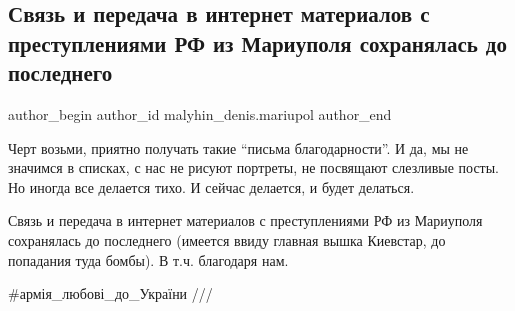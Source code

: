  
 
 
 
 

\subsection{Связь и передача в интернет материалов с преступлениями РФ из Мариуполя сохранялась до последнего}
\label{sec:19_01_2023.fb.malyhin_denis.mariupol.1.svyaz_i_peredacha_v_}

\ifcmt
 author_begin
   author_id malyhin_denis.mariupol
 author_end
\fi

Черт возьми, приятно получать такие \enquote{письма благодарности}. И да, мы не
значимся в списках, с нас не рисуют портреты, не посвящают слезливые посты. Но
иногда все делается тихо. И сейчас делается, и будет делаться. 

Связь и передача в интернет материалов с преступлениями РФ из Мариуполя
сохранялась до последнего (имеется ввиду главная вышка Киевстар, до попадания
туда бомбы). В т.ч. благодаря нам. 

\#армія\_любові\_до\_України ///
